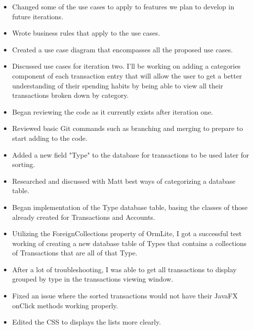 \documentclass{article}
\begin{document}
	\begin{itemize}
		\item Changed some of the use cases to apply to features we plan to develop in 					future iterations.
		\item Wrote business rules that apply to the use cases.
		\item Created a use case diagram that encompasses all the proposed use cases.
	\end{itemize}
	
	\begin{itemize}
		\item Discussed use cases for iteration two. I'll be working on adding a 						categories component of each transaction entry that will allow the user to 					get a better understanding of their spending habits by being able to view 					all their transactions broken down by category. 
	\end{itemize}
	
	\begin{itemize}
		\item Began reviewing the code as it currently exists after iteration one.
		\item Reviewed basic Git commands such as branching and merging to prepare to 					start adding to the code. 
	\end{itemize}
	
	\begin{itemize}
		\item Added a new field "Type" to the database for transactions to be used later 			for sorting.
		\item Researched and discussed with Matt best ways of categorizing a database 					table. 
	\end{itemize}
	
	\begin{itemize}
		\item Began implementation of the Type database table, basing the classes of 					those already created for Transactions and Accounts.
		\item Utilizing the ForeignCollections property of OrmLite, I got a successful 					test working of creating a new database table of Types that contains a 							collections of Transactions that are all of that Type.
		\item After a lot of troubleshooting, I was able to get all transactions to display 			grouped by type in the transactions viewing window.
	\end{itemize}
	
	\begin{itemize}
		\item Fixed an issue where the sorted transactions would not have their JavaFX onClick 		methods working properly.
		\item Edited the CSS to displays the lists more clearly. 
	\end{itemize}
	
\end{document}
